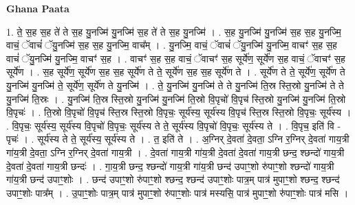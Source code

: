 \documentclass[17pt]{extarticle}
\begin{document}
\textbf{Ghana Paata } \newline

1. ते॒ स॒ह स॒ह ते॑ ते स॒ह यु॒नज्मि॑ यु॒नज्मि॑ स॒ह ते॑ ते स॒ह यु॒नज्मि॑ । . स॒ह यु॒नज्मि॑ यु॒नज्मि॑ स॒ह स॒ह यु॒नज्मि॒ वाचं॒ ॅवाचं॑ ॅयु॒नज्मि॑ स॒ह स॒ह यु॒नज्मि॒ वाच᳚म् । . यु॒नज्मि॒ वाचं॒ ॅवाचं॑ ॅयु॒नज्मि॑ यु॒नज्मि॒ वाचꣳ॑ स॒ह स॒ह वाचं॑ ॅयु॒नज्मि॑ यु॒नज्मि॒ वाचꣳ॑ स॒ह । . वाचꣳ॑ स॒ह स॒ह वाचं॒ ॅवाचꣳ॑ स॒ह सूर्ये॑ण॒ सूर्ये॑ण स॒ह वाचं॒ ॅवाचꣳ॑ स॒ह सूर्ये॑ण । . स॒ह सूर्ये॑ण॒ सूर्ये॑ण स॒ह स॒ह सूर्ये॑ण ते ते॒ सूर्ये॑ण स॒ह स॒ह सूर्ये॑ण ते । . सूर्ये॑ण ते ते॒ सूर्ये॑ण॒ सूर्ये॑ण ते यु॒नज्मि॑ यु॒नज्मि॑ ते॒ सूर्ये॑ण॒ सूर्ये॑ण ते यु॒नज्मि॑ । . ते॒ यु॒नज्मि॑ यु॒नज्मि॑ ते ते यु॒नज्मि॑ ति॒स्र स्ति॒स्रो यु॒नज्मि॑ ते ते यु॒नज्मि॑ ति॒स्रः । . यु॒नज्मि॑ ति॒स्र स्ति॒स्रो यु॒नज्मि॑ यु॒नज्मि॑ ति॒स्रो वि॒पृचो॑ वि॒पृच॑ स्ति॒स्रो यु॒नज्मि॑ यु॒नज्मि॑ ति॒स्रो वि॒पृचः॑ । . ति॒स्रो वि॒पृचो॑ वि॒पृच॑ स्ति॒स्र स्ति॒स्रो वि॒पृचः॒ सूर्य॑स्य॒ सूर्य॑स्य वि॒पृच॑ स्ति॒स्र स्ति॒स्रो वि॒पृचः॒ सूर्य॑स्य । . वि॒पृचः॒ सूर्य॑स्य॒ सूर्य॑स्य वि॒पृचो॑ वि॒पृचः॒ सूर्य॑स्य ते ते॒ सूर्य॑स्य वि॒पृचो॑ वि॒पृचः॒ सूर्य॑स्य ते । . वि॒पृच॒ इति॑ वि - पृचः॑ । . सूर्य॑स्य ते ते॒ सूर्य॑स्य॒ सूर्य॑स्य ते । . त॒ इति॑ ते । . अ॒ग्निर् दे॒वता॑ दे॒वता॒ ऽग्नि र॒ग्निर् दे॒वता॑ गाय॒त्री गा॑य॒त्री दे॒वता॒ ऽग्नि र॒ग्निर् दे॒वता॑ गाय॒त्री । . दे॒वता॑ गाय॒त्री गा॑य॒त्री दे॒वता॑ दे॒वता॑ गाय॒त्री छन्द॒ श्छन्दो॑ गाय॒त्री दे॒वता॑ दे॒वता॑ गाय॒त्री छन्दः॑ । . गा॒य॒त्री छन्द॒ श्छन्दो॑ गाय॒त्री गा॑य॒त्री छन्द॑ उपाꣳ॒॒शो रु॑पाꣳ॒॒शो श्छन्दो॑ गाय॒त्री गा॑य॒त्री छन्द॑ उपाꣳ॒॒शोः । . छन्द॑ उपाꣳ॒॒शो रु॑पाꣳ॒॒शो श्छन्द॒ श्छन्द॑ उपाꣳ॒॒शोः पात्र॒म् पात्र॑ मुपाꣳ॒॒शो श्छन्द॒ श्छन्द॑ उपाꣳ॒॒शोः पात्र᳚म् । . उ॒पाꣳ॒॒शोः पात्र॒म् पात्र॑ मुपाꣳ॒॒शो रु॑पाꣳ॒॒शोः पात्र॑ मस्यसि॒ पात्र॑ मुपाꣳ॒॒शो रु॑पाꣳ॒॒शोः पात्र॑ मसि । \newline
\end{document}
